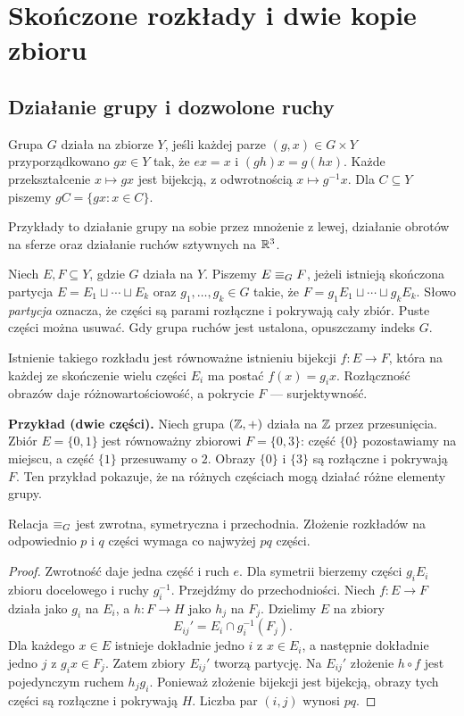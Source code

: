 \section{Skończone rozkłady i dwie kopie zbioru}
\subsection{Działanie grupy i dozwolone ruchy}
\begin{definicja}
Grupa $G$ działa na zbiorze $Y$, jeśli każdej parze $(g,x)\in G\times Y$ przyporządkowano $gx\in Y$ tak, że $ex=x$ i $(gh)x=g(hx)$. Każde przekształcenie $x\mapsto gx$ jest bijekcją, z odwrotnością $x\mapsto g^{-1}x$. Dla $C\subseteq Y$ piszemy $gC=\{gx:x\in C\}$.
\end{definicja}
Przykłady to działanie grupy na sobie przez mnożenie z lewej, działanie obrotów na sferze oraz działanie ruchów sztywnych na $\mathbb R^3$.
\begin{definicja}\label{def:rownorozklad}
Niech $E,F\subseteq Y$, gdzie $G$ działa na $Y$. Piszemy $E\mathrel{\equiv_G} F$, jeżeli istnieją skończona partycja $E=E_1\sqcup\cdots\sqcup E_k$ oraz $g_1,\ldots,g_k\in G$ takie, że $F=g_1E_1\sqcup\cdots\sqcup g_kE_k$. Słowo \emph{partycja} oznacza, że części są parami rozłączne i pokrywają cały zbiór. Puste części można usuwać. Gdy grupa ruchów jest ustalona, opuszczamy indeks $G$.
\end{definicja}
Istnienie takiego rozkładu jest równoważne istnieniu bijekcji $f:E\to F$, która na każdej ze skończenie wielu części $E_i$ ma postać $f(x)=g_ix$. Rozłączność obrazów daje różnowartościowość, a pokrycie $F$ --- surjektywność.

\textbf{Przykład (dwie części).} Niech grupa $(\mathbb Z,+)$ działa na $\mathbb Z$ przez przesunięcia. Zbiór $E=\{0,1\}$ jest równoważny zbiorowi $F=\{0,3\}$: część $\{0\}$ pozostawiamy na miejscu, a część $\{1\}$ przesuwamy o $2$. Obrazy $\{0\}$ i $\{3\}$ są rozłączne i pokrywają $F$. Ten przykład pokazuje, że na różnych częściach mogą działać różne elementy grupy.

\begin{lemat}\label{lem:skladanie}
Relacja $\mathrel{\equiv_G}$ jest zwrotna, symetryczna i przechodnia. Złożenie rozkładów na odpowiednio $p$ i $q$ części wymaga co najwyżej $pq$ części.
\end{lemat}
\begin{proof}
Zwrotność daje jedna część i ruch $e$. Dla symetrii bierzemy części $g_iE_i$ zbioru docelowego i ruchy $g_i^{-1}$. Przejdźmy do przechodniości. Niech $f:E\to F$ działa jako $g_i$ na $E_i$, a $h:F\to H$ jako $h_j$ na $F_j$. Dzielimy $E$ na zbiory
\begin{equation}\label{eq:3-1}
 E_{ij}'=E_i\cap g_i^{-1}(F_j).
\end{equation}
Dla każdego $x\in E$ istnieje dokładnie jedno $i$ z $x\in E_i$, a następnie dokładnie jedno $j$ z $g_ix\in F_j$. Zatem zbiory $E_{ij}'$ tworzą partycję. Na $E_{ij}'$ złożenie $h\circ f$ jest pojedynczym ruchem $h_jg_i$. Ponieważ złożenie bijekcji jest bijekcją, obrazy tych części są rozłączne i pokrywają $H$. Liczba par $(i,j)$ wynosi $pq$.
\end{proof}

